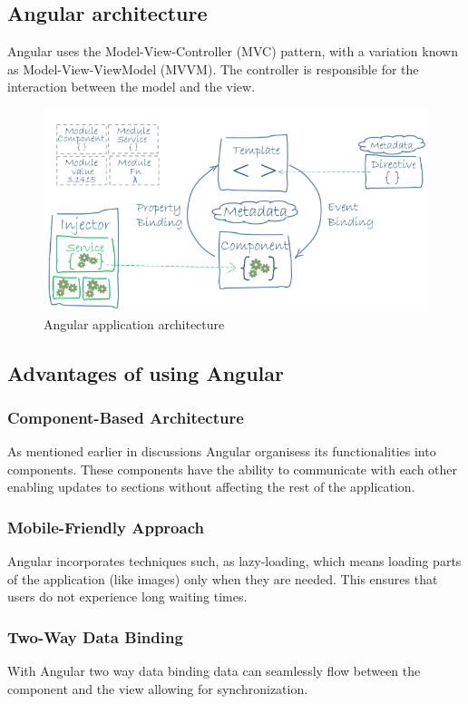 \subsection{Angular architecture}
Angular uses the Model-View-Controller (MVC) pattern, with a variation known as Model-View-ViewModel (MVVM). The controller is responsible for the interaction between the model and the view.

\begin{figure}[ht]
    \centering
    \includegraphics[width=0.85\linewidth]{images/angular-arch.png} 
    \caption{Angular application architecture}
    \label{fig:angular-arch}
\end{figure}

\subsection{Advantages of using Angular}
\subsubsection{Component-Based Architecture} 
 As mentioned earlier in discussions Angular organisess its functionalities into components. These components have the ability to communicate with each other enabling updates to sections without affecting the rest of the application.

\subsubsection{Mobile-Friendly Approach} 
Angular incorporates techniques such, as lazy-loading, which means loading parts of the application (like images) only when they are needed. This ensures that users do not experience long waiting times.

\subsubsection{Two-Way Data Binding} 
With Angular two way data binding data can seamlessly flow between the component and the view allowing for synchronization.

